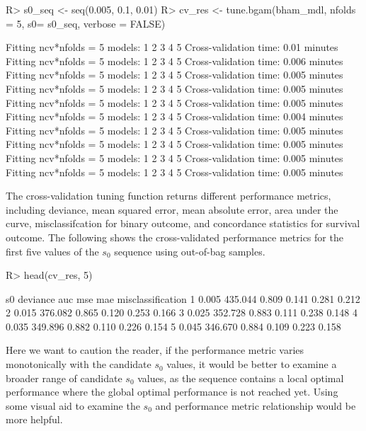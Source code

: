 \documentclass[
]{jss}
\begin{document}
\begin{CodeChunk}
\begin{CodeInput}
R> s0_seq <- seq(0.005, 0.1, 0.01)
R> cv_res <- tune.bgam(bham_mdl, nfolds = 5, s0= s0_seq, verbose = FALSE)
\end{CodeInput}
\begin{CodeOutput}
Fitting ncv*nfolds = 5 models: 
1 2 3 4 5 
 Cross-validation time: 0.01 minutes 
Fitting ncv*nfolds = 5 models: 
1 2 3 4 5 
 Cross-validation time: 0.006 minutes 
Fitting ncv*nfolds = 5 models: 
1 2 3 4 5 
 Cross-validation time: 0.005 minutes 
Fitting ncv*nfolds = 5 models: 
1 2 3 4 5 
 Cross-validation time: 0.005 minutes 
Fitting ncv*nfolds = 5 models: 
1 2 3 4 5 
 Cross-validation time: 0.005 minutes 
Fitting ncv*nfolds = 5 models: 
1 2 3 4 5 
 Cross-validation time: 0.004 minutes 
Fitting ncv*nfolds = 5 models: 
1 2 3 4 5 
 Cross-validation time: 0.005 minutes 
Fitting ncv*nfolds = 5 models: 
1 2 3 4 5 
 Cross-validation time: 0.005 minutes 
Fitting ncv*nfolds = 5 models: 
1 2 3 4 5 
 Cross-validation time: 0.005 minutes 
Fitting ncv*nfolds = 5 models: 
1 2 3 4 5 
 Cross-validation time: 0.005 minutes 
\end{CodeOutput}
\end{CodeChunk}

The cross-validation tuning function returns different performance
metrics, including deviance, mean squared error, mean absolute error,
area under the curve, misclassifcation for binary outcome, and
concordance statistics for survival outcome. The following shows the
cross-validated performance metrics for the first five values of the
\(s_0\) sequence using out-of-bag samples.

\begin{CodeChunk}
\begin{CodeInput}
R> head(cv_res, 5)
\end{CodeInput}
\begin{CodeOutput}
     s0 deviance   auc   mse   mae misclassification
1 0.005  435.044 0.809 0.141 0.281             0.212
2 0.015  376.082 0.865 0.120 0.253             0.166
3 0.025  352.728 0.883 0.111 0.238             0.148
4 0.035  349.896 0.882 0.110 0.226             0.154
5 0.045  346.670 0.884 0.109 0.223             0.158
\end{CodeOutput}
\end{CodeChunk}

Here we want to caution the reader, if the performance metric varies
monotonically with the candidate \(s_0\) values, it would be better to
examine a broader range of candidate \(s_0\) values, as the sequence
contains a local optimal performance where the global optimal
performance is not reached yet. Using some visual aid to examine the
\(s_0\) and performance metric relationship would be more helpful.
\end{document}
